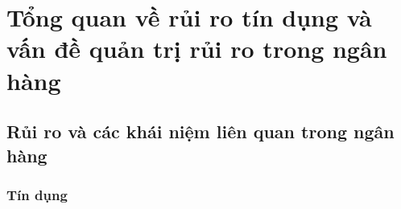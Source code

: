 \section{Tổng quan về rủi ro tín dụng và vấn đề quản trị rủi ro trong ngân hàng}
\subsection{Rủi ro và các khái niệm liên quan trong ngân hàng}
\subsubsection{Tín dụng}
\begin{comment}


Theo quyết định 1627/2001/QĐ-NHNN ngày 31/12/2001 của Thống Đốc Ngân
Hàng Nhà Nước thì cho vay là một hình thức cấp tín dụng, theo đó tổ chức tín dụng
giao cho khách hàng sử dụng một khỏan tiền để sử dụng vào một mục đích và thời gian
nhất định theo thỏa thuận với nguyên tắc có hòan trả cả gốc và lãi.
Như vậy tín dụng ngân hàng là quan hệ chuyển nhượng quyền sử dụng vốn từ
ngân hàng tới khách hàng theo những điều kiện ràng buộc nhất định. Cũng như quan hệ
tín dụng khác, tín dụng ngân hàng chứa đựng ba nội dung:
Có sự chuyển nhượng quyền sử dụng vốn từ người sở hữu sang cho người sử
dụng.
Sự chuyển nhượng này có thời hạn cụ thể.
Sự chuyển nhượng này có kèm theo chi phí. 

Tín dụng DNNVV được hiểu đơn giản là hoạt động tín dụng hay các khoản tín dụng mà các NHTM cấp cho khách hàng là các DNNVV. Như vậy, tín dụng DNNVV là một bộ phận trong hoạt động tín dụng của NHTM, được phân chia dựa trên tiêu chí là đối tượng khách hàng.
Khái niệm chung về tín dụng ngân hàng là giao dịch về tài sản giữa ngân hàng (TCTD) với bên đi vay (là các tổ chức kinh tế, cá nhân trong nền kinh tế) trong đó ngân hàng (TCTD) chuyển giao tài sản cho bên đi vay sử dụng trong một thời gian nhất định theo thoả thuận, và bên đi vay có trách nhiệm hoàn trả vô điều kiện cả vốn gốc và lãi cho ngân hàng (TCTD) khi đến hạn thanh toán.
Theo Luật các tổ chức tín dụng 2010 của Việt Nam: “Cấp tín dụng là việc thỏa thuận để tổ chức, cá nhân sử dụng một khoản tiền hoặc cam kết cho phép sử dụng một khoản tiền theo nguyên tắc có hoàn trả bằng nghiệp vụ cho vay, chiết khấu, cho thuê tài chính, bao thanh toán, bảo lãnh ngân hàng và các nghiệp vụ cấp tín dụng khác”.
Trong hoạt động của các NHTM Việt Nam hiện nay, hoạt động tín dụng là nghiệp vụ nền tảng, truyền thống, đóng vai trò là một trong những hoạt động tạo ra lợi nhuận lớn nhất cũng như chiếm tỷ trọng cao trong cơ cấu tài sản của ngân hàng. Tín dụng là hoạt động tài trợ vốn của ngân hàng cho khách hàng. Hoạt động này luôn đóng vai trò quan trọng nhất, quyết định sự thành bại của ngân hàng. Nó cũng là hoạt động cơ bản, sinh lời chủ yếu của ngân hàng.



\end{comment}
